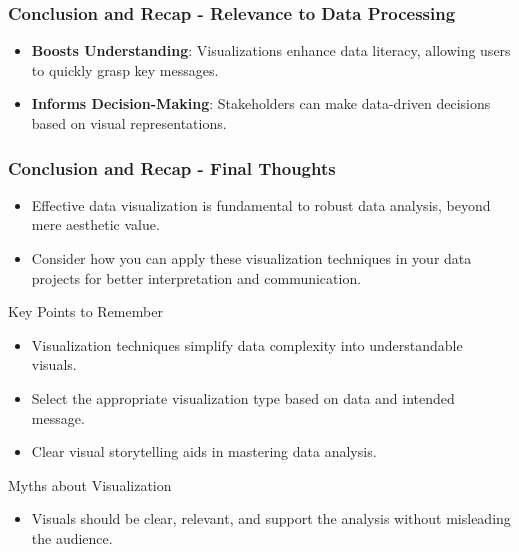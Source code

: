 \documentclass[aspectratio=169]{beamer}
\begin{document}
\begin{frame}[fragile]
    \frametitle{Conclusion and Recap - Relevance to Data Processing}
    \begin{itemize}
        \item \textbf{Boosts Understanding}: Visualizations enhance data literacy, allowing users to quickly grasp key messages.
        \item \textbf{Informs Decision-Making}: Stakeholders can make data-driven decisions based on visual representations.
    \end{itemize}
\end{frame}

\begin{frame}[fragile]
    \frametitle{Conclusion and Recap - Final Thoughts}
    \begin{itemize}
        \item Effective data visualization is fundamental to robust data analysis, beyond mere aesthetic value.
        \item Consider how you can apply these visualization techniques in your data projects for better interpretation and communication.
    \end{itemize}

    \begin{block}{Key Points to Remember}
        \begin{itemize}
            \item Visualization techniques simplify data complexity into understandable visuals.
            \item Select the appropriate visualization type based on data and intended message.
            \item Clear visual storytelling aids in mastering data analysis.
        \end{itemize}
    \end{block}

    \begin{block}{Myths about Visualization}
        \begin{itemize}
            \item Visuals should be clear, relevant, and support the analysis without misleading the audience.
        \end{itemize}
    \end{block}
\end{frame}
\end{document}
